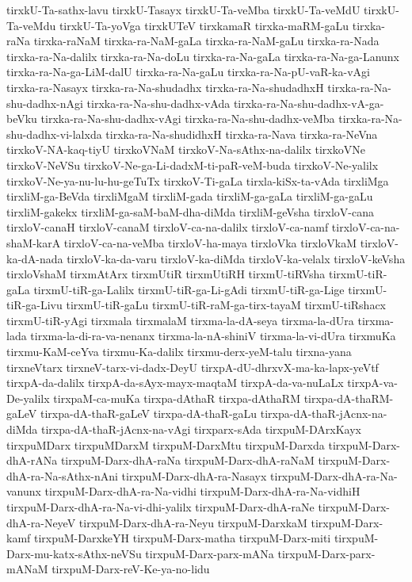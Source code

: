 {tirxkU-Ta-sathx-lavu
tirxkU-Tasayx
tirxkU-Ta-veMba
tirxkU-Ta-veMdU
tirxkU-Ta-veMdu
tirxkU-Ta-yoVga
tirxkUTeV
tirxkamaR
tirxka-maRM-gaLu
tirxka-raNa
tirxka-raNaM
tirxka-ra-NaM-gaLa
tirxka-ra-NaM-gaLu
tirxka-ra-Nada
tirxka-ra-Na-dalilx
tirxka-ra-Na-doLu
tirxka-ra-Na-gaLa
tirxka-ra-Na-ga-Lanunx
tirxka-ra-Na-ga-LiM-dalU
tirxka-ra-Na-gaLu
tirxka-ra-Na-pU-vaR-ka-vAgi
tirxka-ra-Nasayx
tirxka-ra-Na-shudadhx
tirxka-ra-Na-shudadhxH
tirxka-ra-Na-shu-dadhx-nAgi
tirxka-ra-Na-shu-dadhx-vAda
tirxka-ra-Na-shu-dadhx-vA-ga-beVku
tirxka-ra-Na-shu-dadhx-vAgi
tirxka-ra-Na-shu-dadhx-veMba
tirxka-ra-Na-shu-dadhx-vi-lalxda
tirxka-ra-Na-shudidhxH
tirxka-ra-Nava
tirxka-ra-NeVna
tirxkoV-NA-kaq-tiyU
tirxkoVNaM
tirxkoV-Na-sAthx-na-dalilx
tirxkoVNe
tirxkoV-NeVSu
tirxkoV-Ne-ga-Li-dadxM-ti-paR-veM-buda
tirxkoV-Ne-yalilx
tirxkoV-Ne-ya-nu-lu-hu-geTuTx
tirxkoV-Ti-gaLa
tirxla-kiSx-ta-vAda
tirxliMga
tirxliM-ga-BeVda
tirxliMgaM
tirxliM-gada
tirxliM-ga-gaLa
tirxliM-ga-gaLu
tirxliM-gakekx
tirxliM-ga-saM-baM-dha-diMda
tirxliM-geVsha
tirxloV-cana
tirxloV-canaH
tirxloV-canaM
tirxloV-ca-na-dalilx
tirxloV-ca-namf
tirxloV-ca-na-shaM-karA
tirxloV-ca-na-veMba
tirxloV-ha-maya
tirxloVka
tirxloVkaM
tirxloV-ka-dA-nada
tirxloV-ka-da-varu
tirxloV-ka-diMda
tirxloV-ka-velalx
tirxloV-keVsha
tirxloVshaM
tirxmAtArx
tirxmUtiR
tirxmUtiRH
tirxmU-tiRVsha
tirxmU-tiR-gaLa
tirxmU-tiR-ga-Lalilx
tirxmU-tiR-ga-Li-gAdi
tirxmU-tiR-ga-Lige
tirxmU-tiR-ga-Livu
tirxmU-tiR-gaLu
tirxmU-tiR-raM-ga-tirx-tayaM
tirxmU-tiRshacx
tirxmU-tiR-yAgi
tirxmala
tirxmalaM
tirxma-la-dA-seya
tirxma-la-dUra
tirxma-lada
tirxma-la-di-ra-va-nenanx
tirxma-la-nA-shiniV
tirxma-la-vi-dUra
tirxmuKa
tirxmu-KaM-ceYva
tirxmu-Ka-dalilx
tirxmu-derx-yeM-talu
tirxna-yana
tirxneVtarx
tirxneV-tarx-vi-dadx-DeyU
tirxpA-dU-dhrxvX-ma-ka-lapx-yeVtf
tirxpA-da-dalilx
tirxpA-da-sAyx-mayx-maqtaM
tirxpA-da-va-nuLaLx
tirxpA-va-De-yalilx
tirxpaM-ca-muKa
tirxpa-dAthaR
tirxpa-dAthaRM
tirxpa-dA-thaRM-gaLeV
tirxpa-dA-thaR-gaLeV
tirxpa-dA-thaR-gaLu
tirxpa-dA-thaR-jAcnx-na-diMda
tirxpa-dA-thaR-jAcnx-na-vAgi
tirxparx-sAda
tirxpuM-DArxKayx
tirxpuMDarx
tirxpuMDarxM
tirxpuM-DarxMtu
tirxpuM-Darxda
tirxpuM-Darx-dhA-rANa
tirxpuM-Darx-dhA-raNa
tirxpuM-Darx-dhA-raNaM
tirxpuM-Darx-dhA-ra-Na-sAthx-nAni
tirxpuM-Darx-dhA-ra-Nasayx
tirxpuM-Darx-dhA-ra-Na-vanunx
tirxpuM-Darx-dhA-ra-Na-vidhi
tirxpuM-Darx-dhA-ra-Na-vidhiH
tirxpuM-Darx-dhA-ra-Na-vi-dhi-yalilx
tirxpuM-Darx-dhA-raNe
tirxpuM-Darx-dhA-ra-NeyeV
tirxpuM-Darx-dhA-ra-Neyu
tirxpuM-DarxkaM
tirxpuM-Darx-kamf
tirxpuM-DarxkeYH
tirxpuM-Darx-matha
tirxpuM-Darx-miti
tirxpuM-Darx-mu-katx-sAthx-neVSu
tirxpuM-Darx-parx-mANa
tirxpuM-Darx-parx-mANaM
tirxpuM-Darx-reV-Ke-ya-no-lidu
}
